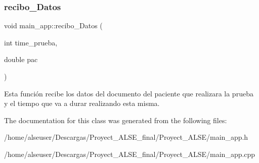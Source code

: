 \subsubsection{\texorpdfstring{recibo\+\_\+\+Datos}{recibo\_Datos}}
{\footnotesize\ttfamily void main\+\_\+app\+::recibo\+\_\+\+Datos (\begin{DoxyParamCaption}\item[{int}]{time\+\_\+prueba,  }\item[{double}]{pac }\end{DoxyParamCaption})\hspace{0.3cm}{\ttfamily [slot]}}

Esta función recibe los datos del documento del paciente que realizara la prueba y el tiempo que va a durar realizando esta misma. 

The documentation for this class was generated from the following files\+:\begin{DoxyCompactItemize}
\item 
/home/alseuser/\+Descargas/\+Proyect\+\_\+\+A\+L\+S\+E\+\_\+final/\+Proyect\+\_\+\+A\+L\+S\+E/main\+\_\+app.\+h\item 
/home/alseuser/\+Descargas/\+Proyect\+\_\+\+A\+L\+S\+E\+\_\+final/\+Proyect\+\_\+\+A\+L\+S\+E/main\+\_\+app.\+cpp\end{DoxyCompactItemize}
